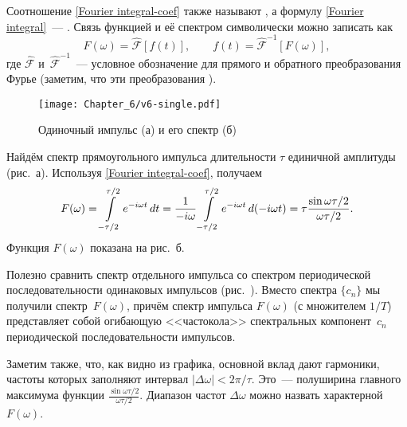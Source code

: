 Соотношение \eqref{Fourier integral-coef} также называют
, а формулу \eqref{Fourier integral}~---
.
Связь функцией и её спектром символически можно записать как
\begin{equation*}
F(\omega) = \hat{\mathcal{F}}[f(t)],\qquad 
f(t) = \hat{\mathcal{F}}^{-1}[F(\omega)],
\end{equation*}
где $\hat{\mathcal{F}}$ и~$\hat{\mathcal{F}}^{-1}$~--- условное обозначение
для прямого и обратного преобразования Фурье (заметим, что
эти преобразования ).

\begin{figure}[h!]
    \centering\texttt{[image: Chapter\_6/v6-single.pdf]}
    \caption{Одиночный импульс (а) и его спектр (б)}
\end{figure}

\begin{lab:example}\label{example:square}
Найдём спектр прямоугольного импульса длительности $\tau$
единичной амплитуды (рис.~а). Используя
\eqref{Fourier integral-coef}, получаем
\begin{equation}
    \eqmark{spectrum-impulse}
    F(\omega)=\int\limits_{-\tau/2}^{\tau/2} e^{-i\omega
t}\,dt=\frac{1}{-i\omega}\int\limits_{-\tau/2}^{\tau/2} e^{-i\omega t}\,
d(-i\omega t)=\tau\frac{\sin\omega\tau/2}{\omega\tau/2}.
\end{equation}
Функция $F(\omega)$ показана на рис.~б.

Полезно сравнить спектр отдельного импульса со спектром периодической
последовательности одинаковых импульсов (рис.~).
Вместо  спектра $\{c_n\}$ мы получили
 спектр~$F(\omega)$, причём
спектр импульса $F(\omega)$ (с множителем $1/T$) представляет собой
огибающую <<частокола>> спектральных компонент~$c_n$
периодической последовательности импульсов.

Заметим также, что, как видно из графика, основной вклад дают гармоники, частоты
которых заполняют интервал $|\Delta\omega|<2\pi/\tau$. Это~--- полуширина
главного максимума функции $\frac{\sin\omega\tau/2}{\omega\tau/2}$. Диапазон
частот $\Delta\omega$ можно назвать характерной 
$F(\omega)$.
\end{lab:example}


\label{sec:indeterminacy}

